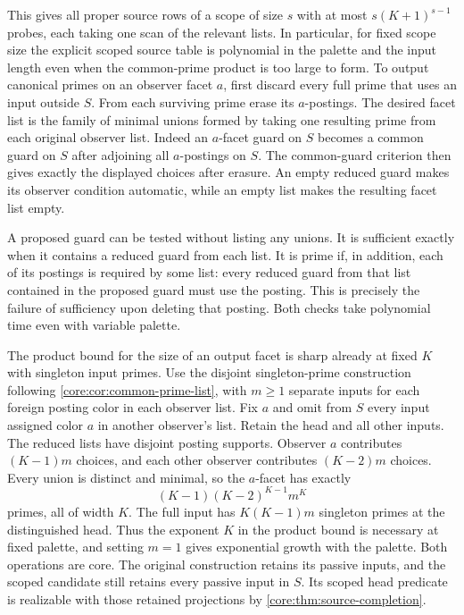 This gives all proper source rows of a scope of size
$s$ with at most $s(K+1)^{s-1}$ probes, each taking
one scan of the relevant lists. In particular, for
fixed scope size the explicit scoped source table is
polynomial in the palette and the input length even
when the common-prime product is too large to form.
To output canonical primes on an observer facet $a$,
first discard every full prime that uses an input
outside $S$. From each surviving prime erase its
$a$-postings. The desired facet list is the family
of minimal unions formed by taking one resulting
prime from each original observer list. Indeed an
$a$-facet guard on $S$ becomes a common guard on
$S$ after adjoining all $a$-postings on $S$.
The common-guard criterion then gives exactly
the displayed choices after erasure. An empty
reduced guard makes its observer condition
automatic, while an empty list makes the resulting
facet list empty.

A proposed guard can be tested without listing any
unions. It is sufficient exactly when it contains a
reduced guard from each list. It is prime if, in
addition, each of its postings is required by some
list: every reduced guard from that list contained
in the proposed guard must use the posting. This
is precisely the failure of sufficiency upon deleting
that posting. Both checks take polynomial time
even with variable palette.

The product bound for the size of an output facet
is sharp already at fixed $K$ with singleton input
primes. Use the disjoint singleton-prime construction
following \cref{core:cor:common-prime-list}, with
$m\geq1$ separate inputs for each foreign posting
color in each observer list. Fix $a$ and omit from
$S$ every input assigned color $a$ in another
observer's list. Retain the head and all other inputs.
The reduced lists have disjoint posting supports.
Observer $a$ contributes $(K-1)m$ choices, and each
other observer contributes $(K-2)m$ choices. Every
union is distinct and minimal, so the $a$-facet has
exactly
\[
                 (K-1)(K-2)^{K-1}m^K
\]
primes, all of width $K$. The full input has
$K(K-1)m$ singleton primes at the distinguished
head. Thus the exponent $K$ in the product bound
is necessary at fixed palette, and setting $m=1$
gives exponential growth with the palette. Both
operations are core. The original construction
retains its passive inputs, and the scoped candidate
still retains every passive input in $S$. Its scoped
head predicate is realizable with those retained
projections by \cref{core:thm:source-completion}.

